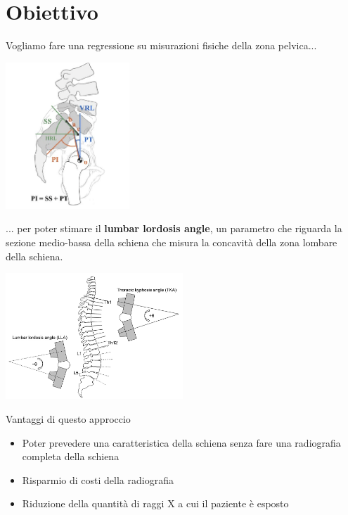 \documentclass{beamer}
\begin{document}
\section{Obiettivo}
\begin{frame}
    Vogliamo fare una regressione su misurazioni fisiche della zona pelvica...
    \begin{center}
        \includegraphics[width=0.35\textwidth]{bacino.png}
    \end{center}
\end{frame}


\begin{frame}
    ... per poter stimare il \textbf{lumbar lordosis angle}, un parametro che riguarda la sezione medio-bassa della schiena che misura la concavità della zona lombare della schiena.
    \begin{center}
        \includegraphics[width=0.5\textwidth]{lla.png}
    \end{center}
\end{frame}


\begin{frame}
    Vantaggi di questo approccio
    \begin{itemize}
        \item Poter prevedere una caratteristica della schiena senza fare una radiografia completa della schiena
        \item Risparmio di costi della radiografia
        \item Riduzione della quantità di raggi X a cui il paziente è esposto
    \end{itemize}
\end{frame}
\end{document}
